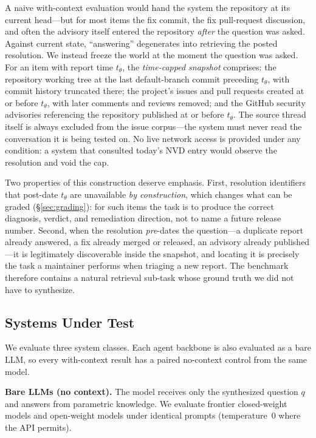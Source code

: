 A naive with-context evaluation would hand the system the repository at its
current head---but for most items the fix commit, the fix pull-request
discussion, and often the advisory itself entered the repository \emph{after}
the question was asked. Against current state, ``answering'' degenerates into
retrieving the posted resolution. We instead freeze the world at the moment the
question was asked. For an item with report time $t_\theta$, the
\emph{time-capped snapshot} comprises: the repository working tree at the last
default-branch commit preceding $t_\theta$, with commit history truncated
there; the project's issues and pull requests created at or before $t_\theta$,
with later comments and reviews removed; and the GitHub security advisories
referencing the repository published at or before $t_\theta$. The source
thread itself is always excluded from the issue corpus---the system must never
read the conversation it is being tested on. No live network access is
provided under any condition:
a system that consulted today's NVD entry would observe the resolution and void
the cap.

Two properties of this construction deserve emphasis. First, resolution
identifiers that post-date $t_\theta$ are unavailable \emph{by construction},
which changes what can be graded (\S\ref{sec:grading}): for such items the task
is to produce the correct diagnosis, verdict, and remediation direction, not to
name a future release number. Second, when the resolution \emph{pre}-dates the
question---a duplicate report already answered, a fix already merged or
released, an advisory already published---it is legitimately discoverable
inside the snapshot, and locating it is precisely the task a maintainer performs
when triaging a new report. The benchmark therefore contains a natural
retrieval sub-task whose ground truth we did not have to synthesize.

\subsection{Systems Under Test}
\label{sec:systems}

We evaluate three system classes. Each agent backbone is also evaluated as a
bare LLM, so every with-context result has a paired no-context control from the
same model.

\textbf{Bare LLMs (no context).} The model receives only the synthesized
question $q$ and answers from parametric knowledge. We evaluate frontier
closed-weight models and open-weight models under identical prompts
(temperature~0 where the API permits).


